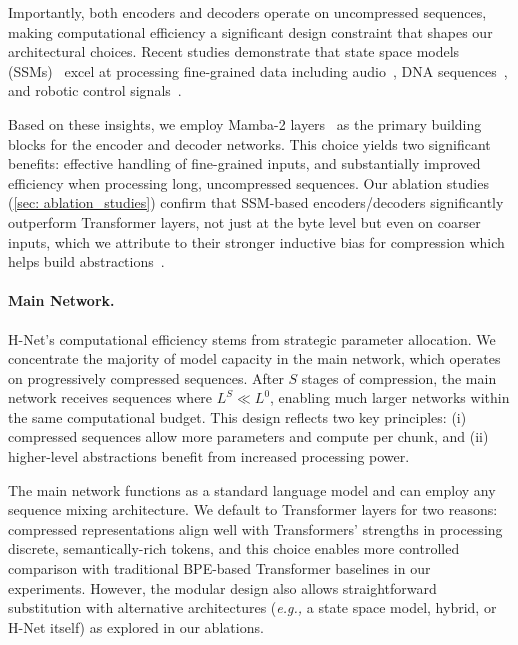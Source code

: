 \documentclass{article}
\newcommand{\citep}{\parencite}
\newcommand{\model}{H-Net}
\newcommand{\main}{main network}
\newcommand{\eg}{\emph{e.g.,}}
\theoremstyle{plain}
\theoremstyle{remark}
\begin{document}
Importantly, both encoders and decoders operate on uncompressed sequences, making computational efficiency a significant design constraint that shapes our architectural choices.
Recent studies demonstrate that state space models (SSMs)~\citep{S4, Mamba} excel at processing fine-grained data including audio~\citep{SaShiMi}, DNA sequences~\citep{Caduceus}, and robotic control signals~\citep{ssm-rl}.

Based on these insights, we employ Mamba-2 layers~\citep{Mamba2} as the primary building blocks for the encoder and decoder networks.
This choice yields two significant benefits: effective handling of fine-grained inputs, and substantially improved efficiency when processing long, uncompressed sequences.
Our ablation studies (\cref{sec: ablation_studies}) confirm that SSM-based encoders/decoders significantly outperform Transformer layers,
not just at the byte level but even on coarser inputs, which we attribute to their stronger inductive bias for compression which helps build abstractions~\citep{gu2025tradeoffs}.

\paragraph{Main Network.}

\model{}'s computational efficiency stems from strategic parameter allocation.
We concentrate the majority of model capacity in the \main{}, which operates on progressively compressed sequences.
After $S$ stages of compression, the \main{} receives sequences where $L^S \ll L^0$, enabling much larger networks within the same computational budget.
This design reflects two key principles: (i) compressed sequences allow more parameters and compute per chunk, and (ii) higher-level abstractions benefit from increased processing power.

The \main{} functions as a standard language model and can employ any sequence mixing architecture.
We default to Transformer layers for two reasons: compressed representations align well with Transformers' strengths in processing discrete, semantically-rich tokens, and this choice enables more controlled comparison with traditional BPE-based Transformer baselines in our experiments.
However, the modular design also allows straightforward substitution with alternative architectures (\eg{} a state space model, hybrid,  or \model{} itself) as explored in our ablations.
\end{document}
